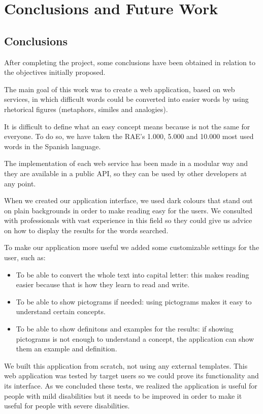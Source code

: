 \chapter{Conclusions and Future Work}
\label{cap:conclusions_futureWork}

\section{Conclusions}
\label{sec:conclusions}

After completing the project, some conclusions have been obtained in relation to the objectives initially proposed.

The main goal of this work was to create a web application, based on web services, in which difficult words could be converted into easier words by using  rhetorical figures (metaphors, similes and analogies).

It is difficult to define what an easy concept means because is not the same for everyone. To do so, we have taken the RAE's 1.000, 5.000 and 10.000 most used words in the Spanish language.

The implementation of each web service has been made in a modular way and they are available in a public API, so they can be used by other developers at any point.

When we created our application interface, we used dark colours that stand out on plain backgrounds in order to make reading easy for the users. We consulted with professionals with vast experience in this field so they could give us advice on how to display the results for the words searched.

To make our application more useful we added some customizable settings for the user, such as:

\begin{itemize}
	\item To be able to convert the whole text into capital letter: this makes reading easier because that is how they learn to read and write.
	\item To be able to show pictograms if needed: using pictograms makes it easy to understand certain concepts.
	\item To be able to show definitons and examples for the results: if showing pictograms is not enough to understand a concept, the application can show them an example and definition.
\end{itemize}

We built this application from scratch, not using any external templates. This web application was tested by target users so we could prove its functionality and its interface. As we concluded these tests, we realized the application is useful for people with mild disabilities but it needs to be improved in order to make it useful for people with severe disabilities.

